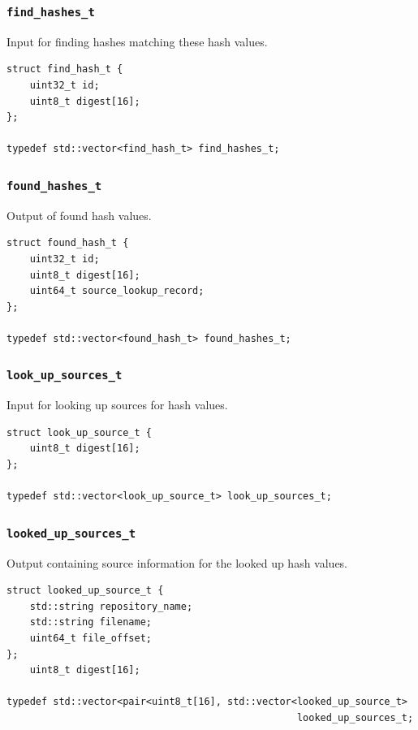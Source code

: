 \documentclass[12pt,twoside]{article}
\begin{document}
\subsubsection{\texttt{find\_hashes\_t}}
Input for finding hashes matching these hash values.

\begin{small}
\begin{verbatim}
struct find_hash_t {
    uint32_t id;
    uint8_t digest[16];
};

typedef std::vector<find_hash_t> find_hashes_t;
\end{verbatim}
\end{small}

\subsubsection{\texttt{found\_hashes\_t}}
Output of found hash values.

\begin{small}
\begin{verbatim}
struct found_hash_t {
    uint32_t id;
    uint8_t digest[16];
    uint64_t source_lookup_record;
};

typedef std::vector<found_hash_t> found_hashes_t;
\end{verbatim}
\end{small}

\subsubsection{\texttt{look\_up\_sources\_t}}
Input for looking up sources for hash values.

\begin{small}
\begin{verbatim}
struct look_up_source_t {
    uint8_t digest[16];
};

typedef std::vector<look_up_source_t> look_up_sources_t;
\end{verbatim}
\end{small}

\subsubsection{\texttt{looked\_up\_sources\_t}}
Output containing source information for the looked up hash values.

\begin{small}
\begin{verbatim}
struct looked_up_source_t {
    std::string repository_name;
    std::string filename;
    uint64_t file_offset;
};
    uint8_t digest[16];

typedef std::vector<pair<uint8_t[16], std::vector<looked_up_source_t>
                                                  looked_up_sources_t;
\end{verbatim}
\end{small}
\end{document}
